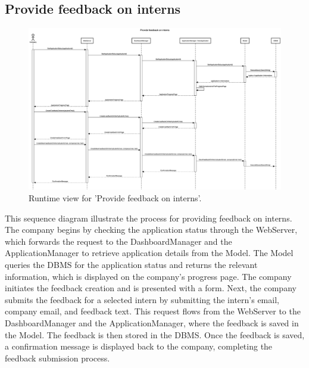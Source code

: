 \subsection{Provide feedback on interns}
\begin{figure}[H]
    \begin{center}
        \includegraphics[width=0.8\linewidth]{DD/LaTeX/Images/RuntimeView/ProvideFeedbackOnIntern.png}
        \caption{Runtime view for 'Provide feedback on interns'.}
        \label{fig:runtime_ProvideFeedbackOnIntern}%
    \end{center}
\end{figure}

This sequence diagram illustrate the process for providing feedback on interns. The company begins by checking the application status through the WebServer, which forwards the request to the DashboardManager and the ApplicationManager to retrieve application details from the Model. The Model queries the DBMS for the application status and returns the relevant information, which is displayed on the company's progress page. The company initiates the feedback creation and is presented with a form. Next, the company submits the feedback for a selected intern by submitting the intern's email, company email, and feedback text. This request flows from the WebServer to the DashboardManager and the ApplicationManager, where the feedback is saved in the Model. The feedback is then stored in the DBMS. Once the feedback is saved, a confirmation message is displayed back to the company, completing the feedback submission process.

